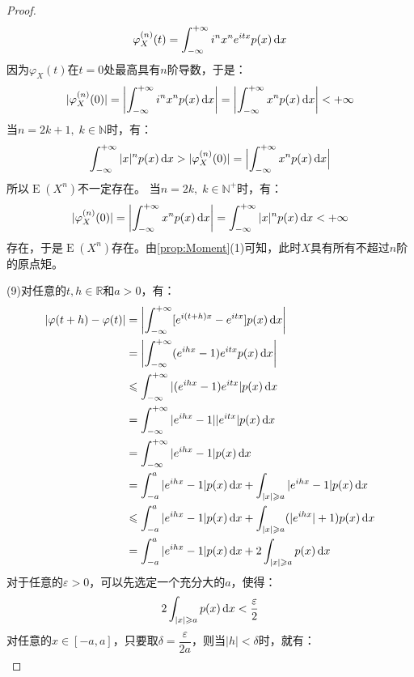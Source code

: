\begin{proof}
\begin{equation*}
		\varphi_X^{(n)}(t)=\int_{-\infty}^{+\infty}i^nx^ne^{itx}p(x)\mathop{}\!\mathrm{d} x
	\end{equation*}
	因为$\varphi_X(t)$在$t=0$处最高具有$n$阶导数，于是：
	\begin{equation*}
		|\varphi_X^{(n)}(0)|=\left|\int_{-\infty}^{+\infty}i^nx^np(x)\mathop{}\!\mathrm{d} x\right|=\left|\int_{-\infty}^{+\infty}x^{n}p(x)\mathop{}\!\mathrm{d} x\right|<+\infty
	\end{equation*}
	当$n=2k+1,\;k\in\mathbb{N}$时，有：
	\begin{equation*}
		\int_{-\infty}^{+\infty}|x|^{n}p(x)\mathop{}\!\mathrm{d} x>|\varphi_X^{(n)}(0)|=\Bigl|\int_{-\infty}^{+\infty}x^np(x)\mathop{}\!\mathrm{d} x\Bigr|
	\end{equation*}
	所以$\operatorname{E}(X^n)$不一定存在。
	当$n=2k,\;k\in\mathbb{N}^+$时，有：
	\begin{equation*}
		|\varphi_X^{(n)}(0)|=\left|\int_{-\infty}^{+\infty}x^{n}p(x)\mathop{}\!\mathrm{d} x\right|=\int_{-\infty}^{+\infty}|x|^np(x)\mathop{}\!\mathrm{d} x<+\infty
	\end{equation*}
	存在，于是$\operatorname{E}(X^n)$存在。由\cref{prop:Moment}(1)可知，此时$X$具有所有不超过$n$阶的原点矩。\par
	(9)对任意的$t,h\in \mathbb{R}$和$a>0$，有：
	\begin{align*}
		|\varphi(t+h)-\varphi(t)|
		&=\left|\int_{-\infty}^{+\infty}[e^{i(t+h)x}-e^{itx}]p(x)\dif x\right| \\
		&=\left|\int_{-\infty}^{+\infty}(e^{ihx}-1)e^{itx}p(x)\dif x\right| \\
		&\leqslant\int_{-\infty}^{+\infty}|(e^{ihx}-1)e^{itx}|p(x)\dif x \\
		&=\int_{-\infty}^{+\infty}|e^{ihx}-1||e^{itx}|p(x)\dif x \\
		&=\int_{-\infty}^{+\infty}|e^{ihx}-1|p(x)\dif x \\
		&=\int_{-a}^{a}|e^{ihx}-1|p(x)\dif x+\int_{|x|\geqslant a}|e^{ihx}-1|p(x)\dif x \\
		&\leqslant\int_{-a}^{a}|e^{ihx}-1|p(x)\dif x+\int_{|x|\geqslant a}(|e^{ihx}|+1)p(x)\dif x \\
		&=\int_{-a}^{a}|e^{ihx}-1|p(x)\dif x+2\int_{|x|\geqslant a}p(x)\dif x
	\end{align*}
	对于任意的$\varepsilon>0$，可以先选定一个充分大的$a$，使得：
	\begin{equation*}
		2\int_{|x|\geqslant a}p(x)\mathop{}\!\mathrm{d} x<\frac{\varepsilon}{2}
	\end{equation*}
	对任意的$x\in[-a,a]$，只要取$\delta=\dfrac{\varepsilon}{2a}$，则当$|h|<\delta$时，就有：
	\begin{align*}

\end{align*}
\end{proof}
